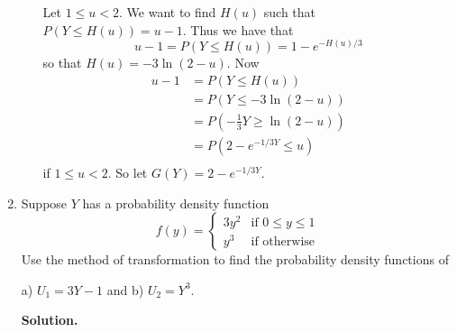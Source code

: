 \documentclass[9pt]{article}
\begin{document}
\begin{enumerate}
\begin{enumerate}
               Let $1 \le u < 2$. We want to find $H(u)$ such that
               $P(Y \le H(u)) = u - 1$. Thus we have that
               $$u - 1 = P(Y \le H(u)) = 1 - e^{-H(u)/3}$$
               so that $H(u) = -3\ln(2 - u)$. Now
               \begin{align*}
                  u - 1 &= P(Y \le H(u)) \\
                        &= P(Y \le -3\ln(2 - u)) \\
                        &= P\left(-\frac{1}{3}Y \ge \ln(2 - u)\right) \\
                        &= P\left(2 - e^{-1/3Y} \le u\right) \\
               \end{align*}
               if $1 \le u < 2$. So let $G(Y) = 2 - e^{-1/3Y}$.
      \end{enumerate}
   \item Suppose $Y$ has a probability density function
         \begin{equation*}
            f(y) = \begin{cases}
               3y^2   & \text{if } 0 \le y \le 1 \\
               y^3 & \text{if } \text{otherwise}
            \end{cases}
         \end{equation*}
         Use the method of transformation to find the probability density
         functions of 

         a) $U_1 = 3Y - 1$ and \qquad b) $U_2 = Y^3$.

      \textbf{Solution.}
      

\end{enumerate}
\end{document}
